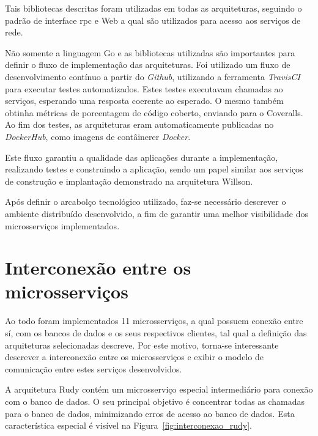 Tais bibliotecas descritas foram utilizadas em todas as arquiteturas, seguindo o padrão de interface \ac{rpc} e Web a qual são utilizados para acesso aos serviços de rede.



Não somente a linguagem Go e as bibliotecas utilizadas são importantes para definir o fluxo de implementação das arquiteturas.
%
Foi utilizado um fluxo de desenvolvimento contínuo a partir do \textit{Github}, utilizando a ferramenta \textit{TravisCI} para executar testes automatizados. Estes testes executavam chamadas ao serviços, esperando uma resposta coerente ao esperado. O mesmo também obtinha métricas de porcentagem de código coberto, enviando para o Coveralls.
%
Ao fim dos testes, as arquiteturas eram automaticamente publicadas no \textit{DockerHub}, como imagens de contâinerer \textit{Docker}.



Este fluxo garantiu a qualidade das aplicações durante a implementação, realizando testes e construindo a aplicação, sendo um papel similar aos serviços de construção e implantação demonstrado na arquitetura Willson.



Após definir o arcabolço tecnológico utilizado, faz-se necessário descrever o ambiente distribuído desenvolvido, a fim de garantir uma melhor visibilidade dos microsserviços implementados.



\section{Interconexão entre os microsserviços}
\label{sec:interconexao}

Ao todo foram implementados 11 microsserviços, a qual possuem conexão entre sí, com os bancos de dados e os seus respectivos clientes, tal qual a definição das arquiteturas selecionadas descreve.
%
Por este motivo, torna-se interessante descrever a interconexão entre os microsserviços e exibir o modelo de comunicação entre estes serviços desenvolvidos.



A arquitetura Rudy contém um microsserviço especial intermediário para conexão com o banco de dados.
%
O seu principal objetivo é concentrar todas as chamadas para o banco de dados, minimizando erros de acesso ao banco de dados.
%
Esta característica especial é visível na Figura~\ref{fig:interconexao_rudy}.



